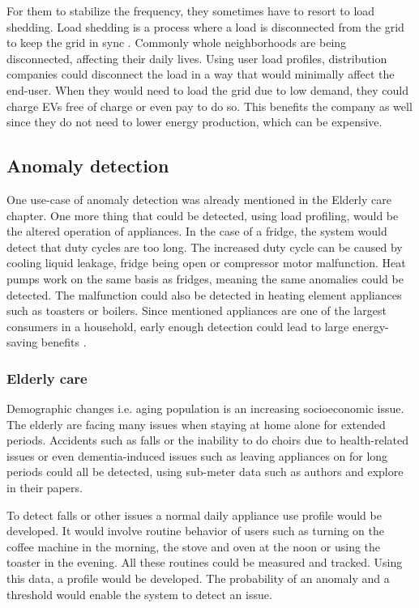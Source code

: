 For them to stabilize the frequency, they sometimes have to resort to load shedding.
Load shedding is a process where a load is disconnected from the grid to keep the grid in sync \cite{loadShedding2006}.
Commonly whole neighborhoods are being disconnected, affecting their daily lives.
Using user load profiles, distribution companies could disconnect the load in a way that would minimally affect the end-user. 
When they would need to load the grid due to low demand, they could charge EVs free of charge or even pay to do so. 
This benefits the company as well since they do not need to lower energy production, which can be expensive. 

\subsection{Anomaly detection}

One use-case of anomaly detection was already mentioned in the Elderly care chapter.
One more thing that could be detected, using load profiling, would be the altered operation of appliances.
In the case of a fridge, the system would detect that duty cycles are too long.
The increased duty cycle can be caused by cooling liquid leakage, fridge being open or compressor motor malfunction.
Heat pumps work on the same basis as fridges, meaning the same anomalies could be detected. 
The malfunction could also be detected in heating element appliances such as toasters or boilers. 
Since mentioned appliances are one of the largest consumers in a household,
early enough detection could lead to large energy-saving benefits \cite{NILMAD2019}.

\subsubsection{Elderly care}

Demographic changes i.e. aging population is an increasing socioeconomic issue.
The elderly are facing many issues when staying at home alone for extended periods.
Accidents such as falls or the inability to do choirs due to health-related issues or even dementia-induced issues 
such as leaving appliances on for long periods could all be detected, using sub-meter data such as authors \cite{elder1} and \cite{elder2}
explore in their papers.

To detect falls or other issues a normal daily appliance use profile would be developed.
It would involve routine behavior of users such as turning on the coffee machine in the morning, the stove and oven at the noon or using the toaster in the evening.
All these routines could be measured and tracked. Using this data, a profile would be developed.
The probability of an anomaly and a threshold would enable the system to detect an issue.

